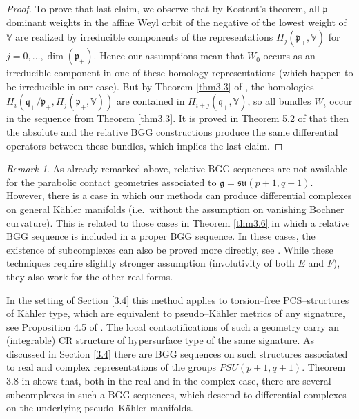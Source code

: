 \documentclass[12pt,a4paper]{amsart}
\def\frak{\mathfrak}
\def\Bbb{\mathbb}
\newcounter{theorem}
\numberwithin{theorem}{section}
\theoremstyle{definition}
\theoremstyle{remark}
\newtheorem{remark}[theorem]{Remark}
\begin{document}
\begin{proof}
To prove that last claim, we observe that by Kostant's theorem, all
$\frak p$--dominant weights in the affine Weyl orbit of the negative
of the lowest weight of $\Bbb V$ are realized by irreducible
components of the representations $H_j(\frak p_+,\Bbb V)$ for
$j=0,\dots,\dim(\frak p_+)$. Hence our assumptions mean that $W_0$
occurs as an irreducible component in one of these homology
representations (which happen to be irreducible in our case). But by
Theorem \ref{thm3.3} of \cite{Rel-BGG1}, the homologies $H_i(\frak
q_+/\frak p_+,H_j(\frak p_+,\Bbb V))$ are contained in $H_{i+j}(\frak
q_+,\Bbb V)$, so all bundles $W_i$ occur in the sequence from Theorem
\ref{thm3.3}. It is proved in Theorem 5.2 of \cite{Rel-BGG2} that then
the absolute and the relative BGG constructions produce the same
differential operators between these bundles, which implies the last
claim. 
\end{proof}

\begin{remark}\label{rem3.6}
  As already remarked above, relative BGG sequences are not available
  for the parabolic contact geometries associated to $\frak
  g=\frak{su}(p+1,q+1)$. However, there is a case in which our methods
  can produce differential complexes on general K\"ahler manifolds
  (i.e.~without the assumption on vanishing Bochner curvature). This
  is related to those cases in Theorem \ref{thm3.6} in which a relative
  BGG sequence is included in a proper BGG sequence. In these cases,
  the existence of subcomplexes can also be proved more directly, see
  \cite{subcomplexes}. While these techniques require slightly
  stronger assumption (involutivity of both $E$ and $F$), they also
  work for the other real forms. 

  In the setting of Section \ref{3.4} this method applies to
  torsion--free PCS--structures of K\"ahler type, which are equivalent
  to pseudo--K\"ahler metrics of any signature, see Proposition 4.5 of
  \cite{PCS1}. The local contactifications of such a geometry carry an
  (integrable) CR structure of hypersurface type of the same
  signature. As discussed in Section \ref{3.4} there are BGG sequences
  on such structures associated to real and complex representations of
  the groups $PSU(p+1,q+1)$. Theorem 3.8 in \cite{subcomplexes} shows
  that, both in the real and in the complex case, there are several
  subcomplexes in such a BGG sequences, which descend to differential
  complexes on the underlying pseudo--K\"ahler manifolds.
\end{remark}
\end{document}
